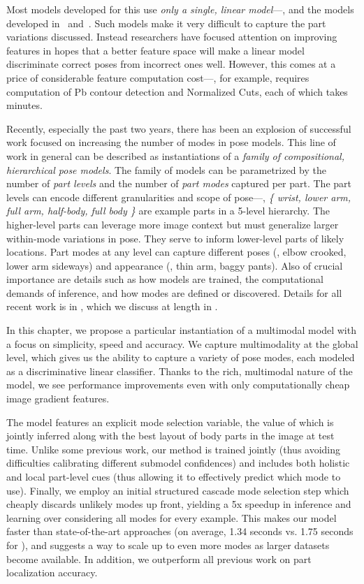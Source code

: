 Most models developed for this use {\em only a single, linear model}---\eg, 
\citet{devacrf,eichner09,andriluka09,ddtran} and the models developed 
in~ and~.
Such models make it very difficult to capture the part variations discussed.  
Instead researchers have focused attention on improving features in hopes that 
a better feature space will make a linear model discriminate correct poses from 
incorrect ones well.  However, this comes at a price of considerable feature 
computation cost---\CPS, for example, requires computation of Pb contour 
detection and Normalized Cuts, each of which takes minutes.

Recently, especially the past two years, there has been an explosion of  
successful work focused on increasing the number of modes in pose models. This 
line of work in general can be described as instantiations of a {\em family of 
compositional, hierarchical pose models}.  The family of models can be 
parametrized by the number of {\em part levels } and the number of {\em part 
modes} captured per part.  The part levels can encode different granularities 
and scope of pose---\eg, {\em \{ wrist, lower arm, full arm, half-body, full 
body \}} are example parts in a 5-level hierarchy.  The higher-level parts can 
leverage more image context but must generalize larger within-mode variations 
in pose.  They serve to inform lower-level parts of likely locations.  Part 
modes at any level can capture different poses (\eg, elbow crooked, lower arm 
sideways) and appearance (\eg, thin arm, baggy pants).  Also of crucial 
importance are details such as how models are trained, the computational 
demands of inference, and how modes are defined or discovered.  Details for all 
recent work is in , which we discuss at length in 
.


 In this chapter, we propose a particular instantiation of 
a multimodal model with a focus on simplicity, speed and accuracy.  We capture 
multimodality at the global level, which gives us the ability to capture a 
variety of pose modes, each modeled as a discriminative linear classifier.  
Thanks to the rich, multimodal nature of the model, we see performance 
improvements even with only computationally cheap image gradient features.  

The model features an explicit mode selection variable, the value of which is 
jointly inferred along with the best layout of body parts in the image at test 
time.  Unlike some previous work, our method is trained jointly (thus avoiding 
difficulties calibrating different submodel confidences) and includes both 
holistic and local part-level cues (thus allowing it to effectively predict 
which mode to use).  Finally, we employ an initial structured cascade mode 
selection step which cheaply discards unlikely modes up front, yielding a 5x 
speedup in inference and learning over considering all modes for every example.  
This makes our model faster than state-of-the-art approaches (on average, 1.34 
seconds vs. 1.75 seconds for \citet{deva2011}), and suggests a way to scale up 
to even more modes as larger datasets become available.  In addition, we 
outperform all previous work on part localization accuracy.  
 

